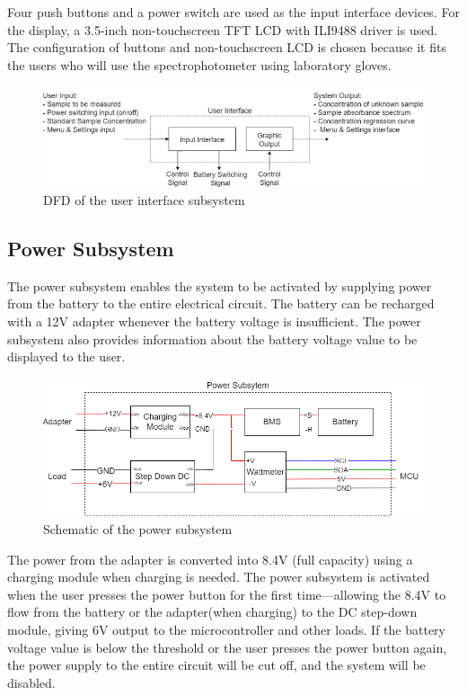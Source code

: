 \documentclass[conference]{IEEEtran}
\begin{document}
Four push buttons and a power switch are used as the input interface devices.
For the display, a 3.5-inch non-touchscreen TFT LCD with ILI9488 driver is used.
The configuration of buttons and non-touchscreen LCD is chosen because it fits the users who will use the spectrophotometer using laboratory gloves.

    \begin{figure}[htbp]
    \centerline{\includegraphics[scale=0.43]{ui-dfd.png}}
    \caption{DFD of the user interface subsystem}
    \label{ui-dfd}
    \end{figure}


\subsection{Power Subsystem}
The power subsystem enables the system to be activated by supplying power from the battery to the entire electrical circuit. 
The battery can be recharged with a 12V adapter whenever the battery voltage is insufficient. 
The power subsystem also provides information about the battery voltage value to be displayed to the user. 

\begin{figure}[htbp]
    \centerline{\includegraphics[scale=0.3]{power-schematic.png}}
    \caption{Schematic of the power subsystem}
    \label{power-dfd}
    \end{figure}

The power from the adapter is converted into 8.4V (full capacity) using a charging module when charging is needed.
The power subsystem is activated when the user presses the power button for the first time—allowing the 8.4V to flow from the battery or the adapter(when charging) to the DC step-down module, giving 6V output to the microcontroller and other loads. 
If the battery voltage value is below the threshold or the user presses the power button again, the power supply to the entire circuit will be cut off, and the system will be disabled.
\end{document}
